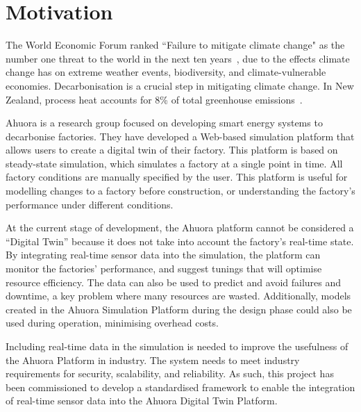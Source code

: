 \documentclass[12pt]{report}
\begin{document}

\section{Motivation}

The World Economic Forum ranked ``Failure to mitigate climate change" as the number one threat to the world in the next ten years~\cite{GlobalRisksReport}, due to the effects climate change has on extreme weather events, biodiversity, and climate-vulnerable economies. Decarbonisation is a crucial step in mitigating climate change. In New Zealand, process heat accounts for 8\% of total greenhouse emissions~\cite{DecarbonisingProcessHeat}.

Ahuora is a research group focused on developing smart energy systems to decarbonise factories. They have developed a Web-based simulation platform that allows users to create a digital twin of their factory.
This platform is based on steady-state simulation, which simulates a factory at a single point in time. All factory conditions are manually specified by the user.
This platform is useful for modelling changes to a factory before construction, or understanding the factory's performance under different conditions.

At the current stage of development, the Ahuora platform cannot be considered a ``Digital Twin'' because it does not take into account the factory's real-time state.
By integrating real-time sensor data into the simulation, the platform can monitor the factories' performance, and suggest tunings that will optimise resource efficiency.
The data can also be used to predict and avoid failures and downtime, a key problem where many resources are wasted.
Additionally, models created in the Ahuora Simulation Platform during the design phase could also be used during operation, minimising overhead costs.

Including real-time data in the simulation is needed to improve the usefulness of the Ahuora Platform in industry.
The system needs to meet industry requirements for security, scalability, and reliability. As such, this project
has been commissioned to develop a standardised framework to enable the integration of real-time sensor data into the Ahuora Digital Twin Platform.

\end{document}
